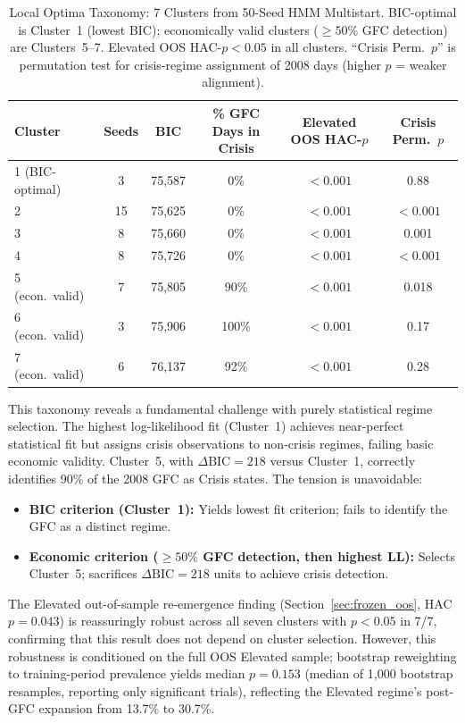 \documentclass[sigconf,anonymous]{acmart}
\begin{document}
\begin{table}[t]
\centering
\caption{Local Optima Taxonomy: 7 Clusters from 50-Seed HMM Multistart.
BIC-optimal is Cluster~1 (lowest BIC); economically valid clusters ($\geq 50\%$ GFC detection)
are Clusters~5--7. Elevated OOS HAC-$p < 0.05$ in all clusters. ``Crisis Perm.\ $p$'' is
permutation test for crisis-regime assignment of 2008 days (higher $p$ = weaker alignment).}
\label{tab:local_optima}
\scriptsize
\begin{tabular}{@{}lccccc@{}}
\toprule
Cluster & Seeds & BIC & \% GFC Days in Crisis & Elevated OOS HAC-$p$ & Crisis Perm.\ $p$ \\
\midrule
1 (BIC-optimal) & 3 & 75{,}587 & 0\% & $< 0.001$ & 0.88 \\
2 & 15 & 75{,}625 & 0\% & $< 0.001$ & $< 0.001$ \\
3 & 8 & 75{,}660 & 0\% & $< 0.001$ & 0.001 \\
4 & 8 & 75{,}726 & 0\% & $< 0.001$ & $< 0.001$ \\
5 (econ.\ valid) & 7 & 75{,}805 & 90\% & $< 0.001$ & 0.018 \\
6 (econ.\ valid) & 3 & 75{,}906 & 100\% & $< 0.001$ & 0.17 \\
7 (econ.\ valid) & 6 & 76{,}137 & 92\% & $< 0.001$ & 0.28 \\
\bottomrule
\end{tabular}
\end{table}

This taxonomy reveals a fundamental challenge with purely statistical regime selection.
The highest log-likelihood fit (Cluster~1) achieves near-perfect statistical fit but
assigns crisis observations to non-crisis regimes, failing basic economic validity.
Cluster~5, with $\Delta\text{BIC} = 218$ versus Cluster~1, correctly identifies 90\% of
the 2008 GFC as Crisis states. The tension is unavoidable:
\begin{itemize}
\item \textbf{BIC criterion (Cluster~1):} Yields lowest fit criterion; fails to identify
the GFC as a distinct regime.
\item \textbf{Economic criterion ($\geq 50\%$ GFC detection, then highest LL):} Selects
Cluster~5; sacrifices $\Delta\text{BIC} = 218$ units to achieve crisis detection.
\end{itemize}

The Elevated out-of-sample re-emergence finding (Section~\ref{sec:frozen_oos}, HAC $p = 0.043$)
is reassuringly robust across all seven clusters with $p < 0.05$ in 7/7, confirming that
this result does not depend on cluster selection. However, this robustness is conditioned on
the full OOS Elevated sample; bootstrap reweighting to training-period prevalence yields
median $p = 0.153$ (median of 1{,}000 bootstrap resamples, reporting only significant trials),
reflecting the Elevated regime's post-GFC expansion from 13.7\% to 30.7\%.
\end{document}
